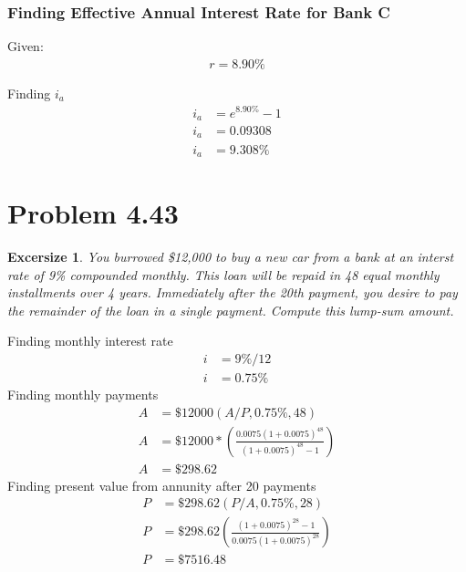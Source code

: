 \documentclass{report} %
\newtheorem{exrc}{Excersize}
\begin{document}
\subsubsection*{Finding Effective Annual Interest Rate for Bank C}
Given:
\begin{equation*}
    \begin{aligned}
        r = 8.90\%
    \end{aligned}
\end{equation*}

\noindent
Finding $i_a$
\begin{equation*}
    \begin{aligned}
        i_a &= e^{8.90\%} - 1 \\
        i_a &= 0.09308 \\
        i_a &= 9.308\%
    \end{aligned}
\end{equation*}

\section*{Problem 4.43}
\begin{exrc}
    You burrowed \$12,000 to buy a new car from a bank at an interst rate of 9\% compounded monthly. This loan will be repaid in 48 equal monthly installments over 4 years. Immediately after the 20th payment, you desire to pay the remainder of the loan in a single payment. Compute this lump-sum amount.
\end{exrc}
Finding monthly interest rate
\begin{equation*}
    \begin{aligned}
        i &= 9\%/12 \\
        i &= 0.75\%
    \end{aligned}
\end{equation*}
Finding monthly payments 
\begin{equation*}
    \begin{aligned}
        A &= \$12000(A/P, 0.75\%, 48) \\
        A &= \$12000*\left(\frac{0.0075(1+0.0075)^{48}}{(1+0.0075)^{48}-1}\right) \\
        A &= \$298.62
    \end{aligned}
\end{equation*}
Finding present value from annunity after 20 payments
\begin{equation*}
    \begin{aligned}
        P &= \$298.62(P/A,0.75\%,28) \\
        P &= \$298.62\left(\frac{(1+0.0075)^{28}-1}{0.0075(1+0.0075)^{28}}\right) \\
        P &= \$7516.48
    \end{aligned}
\end{equation*}
\end{document}
